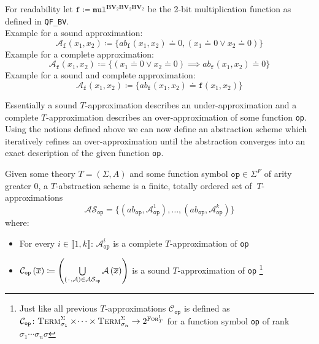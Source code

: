 \begin{example}
For readability let $\texttt{f} \coloneqq \texttt{mul}^{\mathbf{BV}_2\mathbf{BV}_2\mathbf{BV}_2}$ be the 2-bit multiplication function as defined in \texttt{QF\_BV}.\\
Example for a sound approximation:
\[
    \mathcal{A}_\texttt{f}\left(x_1,x_2\right) 
    \coloneqq \{
    ab_\texttt{f}\left(x_1,x_2\right) \doteq 0, \left(x_1\doteq 0 \lor x_2 \doteq 0\right)
    \}
\]
Example for a complete approximation:
\[
    \mathcal{A}_\texttt{f}\left(x_1,x_2\right) 
    \coloneqq \{
    \left(x_1\doteq 0 \lor x_2 \doteq 0\right) \implies ab_\texttt{f}\left(x_1,x_2\right) \doteq 0
    \}
\]
Example for a sound and complete approximation:
\[
\mathcal{A}_\texttt{f}\left(x_1,x_2\right) 
        \coloneqq \{
        ab_\texttt{f}\left(x_1,x_2\right) \doteq \texttt{f}\left(x_1,x_2\right)
        \}
\]
\end{example}
Essentially a sound $T$-approximation describes an under-approximation and a complete $T$-approximation describes an over-approximation of some function \texttt{op}. Using the notions defined above we can now define an abstraction scheme which iteratively refines an over-approximation until the abstraction converges into an exact description of the given function \texttt{op}.
\begin{definition}
Given some theory $T=\left(\Sigma,A\right)$ and some function symbol $\texttt{op}\in\Sigma^F$ of arity greater $0$, a $T$-abstraction scheme is a finite, totally ordered set of $\ T$-approximations \[
\mathcal{AS}_{\texttt{op}} = \{ \left(ab_{\texttt{op}}, \mathcal{A}^1_{\texttt{op}}\right),\dots,\left(ab_{\texttt{op}}, \mathcal{A}^k_{\texttt{op}}\right) \}
\]
where:
\begin{itemize}
    \item For every $i\in\llbracket1,k\rrbracket$: $\mathcal{A}^i_{\texttt{op}}$ is a complete $T$-approximation of \texttt{op}
    \item $\mathcal{C}_{\texttt{op}}\left(\overline{x}\right)\coloneqq\left(\bigcup\limits_{\left({\mkern 2mu\cdot\mkern 2mu},\mathcal{A}\right)\in\mathcal{AS}_{\texttt{op}}} \mathcal{A}\left(\overline{x}\right)\right)$ is a sound $T$-approximation of \texttt{op}
    \footnote{
        Just like all previous $T$-approximations $\mathcal{C}_{\texttt{op}}$ is defined as
        $\mathcal{C}_{\texttt{op}}\colon \textsc{Term}^\Sigma_{\sigma_1}\times\dotsi\times\textsc{Term}^\Sigma_{\sigma_n} \to 2^{\textsc{For}^1_T}$ for a function symbol \texttt{op} of rank $\sigma_1\dotsi\sigma_n\sigma$
    }
\end{itemize}
\end{definition}

